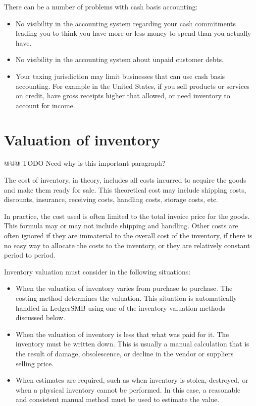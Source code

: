 There can be a number of problems with \gls{cash basis} accounting:
\begin{itemize}
	\item No visibility in the accounting system regarding your cash commitments leading
	you to think you have more or less money to spend than you actually have.
	\item No visibility in the accounting system about unpaid customer debts.
	\item Your taxing jurisdiction may limit businesses that can use cash basis accounting.
	For example in the United States, if you sell products or services on credit,
	have gross receipts higher that allowed, or need inventory to account for income.
\end{itemize}

\section{Valuation of inventory}
\label{sec-accounting-valuation-inventory}

@@@ TODO Need why is this important paragraph?

The cost of inventory, in theory, includes all costs incurred to acquire the goods and make 
them ready for sale. This theoretical cost may include shipping costs, discounts, insurance, 
receiving costs, handling costs, storage costs, etc.

In practice, the cost used is often limited to the total invoice price for the goods.
This formula may or may not include shipping and handling.
Other costs are often ignored if they are immaterial to the overall cost of the inventory, if there
is no easy way to allocate the costs to the inventory, or they are relatively constant period to period.

Inventory valuation must consider in the following situations:
\begin{itemize}
	\item When the valuation of inventory varies from purchase to purchase. The costing method
	determines the valuation.  This situation is automatically handled in LedgerSMB using one of the
	inventory valuation methods discussed below.
	\item When the valuation of inventory is less that what was paid for it. The inventory must
	be written down. This is usually a manual calculation that is the result of damage, obsolescence, 
	or decline in the vendor or suppliers selling price.
	\item When estimates are required, such as when inventory is stolen, destroyed, or when a physical inventory
	cannot be performed. In this case, a reasonable and consistent manual method must be used to 
	estimate the value. 
\end{itemize}

